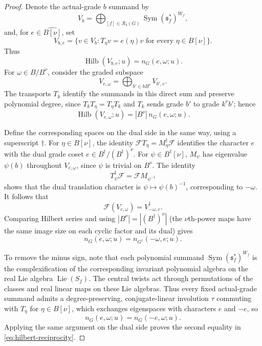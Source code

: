 \documentclass[11pt,a4paper,reqno]{amsart}
\theoremstyle{plain}
\theoremstyle{definition}
\theoremstyle{remark}
\numberwithin{equation}{section}
\DeclareMathOperator{\Lie}{Lie}
\DeclareMathOperator{\Sym}{Sym}
\newcommand{\cR}{\mathcal R}
\begin{document}
\begin{proof}
Denote the actual-grade $b$ summand by
\[
V_b=\bigoplus_{[f]\in\cR_b(G)}\Sym(\mathfrak s_f^*)^{W_f},
\]
and, for $e\in\widehat{B[\nu]}$, set
\[
V_{b,e}=\{v\in V_b:T_\eta v=e(\eta)v\text{ for every }\eta\in B[\nu]\}.
\]
Thus
\[
\operatorname{Hilb}(V_{b,e};u)=n_G(e,\omega;u).
\]
For $\omega\in B/B^\nu$, consider the graded subspace
\[
V_{e,\omega}=\bigoplus_{b'\in bB^\nu}V_{b',e}.
\]
The transports $T_k$ identify the summands in this direct sum and preserve polynomial degree, since $T_kT_\eta=T_\eta T_k$ and $T_k$ sends grade $b'$ to grade $k^\nu b'$; hence
\[
\operatorname{Hilb}(V_{e,\omega};u)=|B^\nu|\,n_G(e,\omega;u).
\]

Define the corresponding spaces on the dual side in the same way, using a superscript $\dagger$. For $\eta\in B[\nu]$, the identity $\mathcal F T_\eta=M_\eta^\dagger\mathcal F$ identifies the character $e$ with the dual grade coset $e\in B^\dagger/(B^\dagger)^\nu$. For $\psi\in B^\dagger[\nu]$, $M_\psi$ has eigenvalue $\psi(b)$ throughout $V_{e,\omega}$, since $\psi$ is trivial on $B^\nu$. The identity
\[
T_\psi^\dagger\mathcal F=\mathcal F M_{\psi^{-1}}
\]
shows that the dual translation character is $\psi\mapsto\psi(b)^{-1}$, corresponding to $-\omega$. It follows that
\[
\mathcal F(V_{e,\omega})=V^\dagger_{-\omega,e}.
\]
Comparing Hilbert series and using $|B^\nu|=|(B^\dagger)^\nu|$ (the $\nu$th-power maps have the same image size on each cyclic factor and its dual) gives
\[
n_G(e,\omega;u)=n_{G^\dagger}(-\omega,e;u).
\]

To remove the minus sign, note that each polynomial summand $\Sym(\mathfrak s_f^*)^{W_f}$ is the complexification of the corresponding invariant polynomial algebra on the real Lie algebra $\Lie(S_f)$. The central twists act through permutations of the classes and real linear maps on these Lie algebras. Thus every fixed actual-grade summand admits a degree-preserving, conjugate-linear involution $\tau$ commuting with $T_\eta$ for $\eta\in B[\nu]$, which exchanges eigenspaces with characters $e$ and $-e$, so
\[
n_G(e,\omega;u)=n_G(-e,\omega;u).
\]
Applying the same argument on the dual side proves the second equality in \eqref{eq:hilbert-reciprocity}.


\end{proof}
\end{document}
